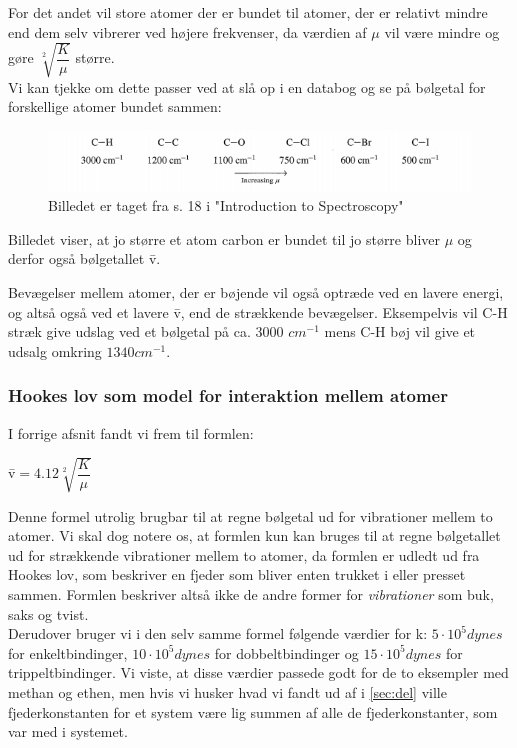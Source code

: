 For det andet vil store atomer der er bundet til atomer, der er relativt mindre end dem selv vibrerer ved højere frekvenser, da værdien af $\mu$ vil være mindre og gøre $\sqrt[2]{\dfrac{K}{\mu}}$ større. 
\\

Vi kan tjekke om dette passer ved at slå op i en databog og se på bølgetal for forskellige atomer bundet sammen:
\\
\begin{figure}
\includegraphics[scale=1]{Billeder/udklip}
\caption{Billedet er taget fra s. 18 i "Introduction to Spectroscopy"}
\end{figure}

Billedet viser, at jo større et atom carbon er bundet til jo større bliver $\mu$ og derfor også bølgetallet \={v}.

Bevægelser mellem atomer, der er bøjende vil også optræde ved en lavere energi, og altså også ved et lavere \={v}, end de strækkende bevægelser. Eksempelvis vil C-H stræk give udslag ved et bølgetal på ca. 3000 $cm^{-1}$ mens C-H bøj vil give et udsalg omkring $1340cm^{-1}$.

\subsubsection{Hookes lov som model for interaktion mellem atomer}
I forrige afsnit fandt vi frem til formlen:

\begin{center}
\={v}$=4.12 \sqrt[2]{\dfrac{K}{\mu}}$
\end{center}

Denne formel utrolig brugbar til at regne bølgetal ud for vibrationer mellem to atomer. Vi skal dog notere os, at formlen kun kan bruges til at regne bølgetallet ud for strækkende vibrationer mellem to atomer, da formlen er udledt ud fra Hookes lov, som beskriver en fjeder som bliver enten trukket i eller presset sammen. Formlen beskriver altså ikke de andre former for \emph{vibrationer} som buk, saks og tvist.
\\

Derudover bruger vi i den selv samme formel følgende værdier for k: $5 \cdot 10^5 dynes$ for enkeltbindinger, $10 \cdot 10^5 dynes$ for dobbeltbindinger og $15 \cdot 10^5 dynes$ for trippeltbindinger. Vi viste, at disse værdier passede godt for de to eksempler med methan og ethen, men hvis vi husker hvad vi fandt ud af i \ref{sec:del} ville fjederkonstanten for et system være lig summen af alle de fjederkonstanter, som var med i systemet.
\\

